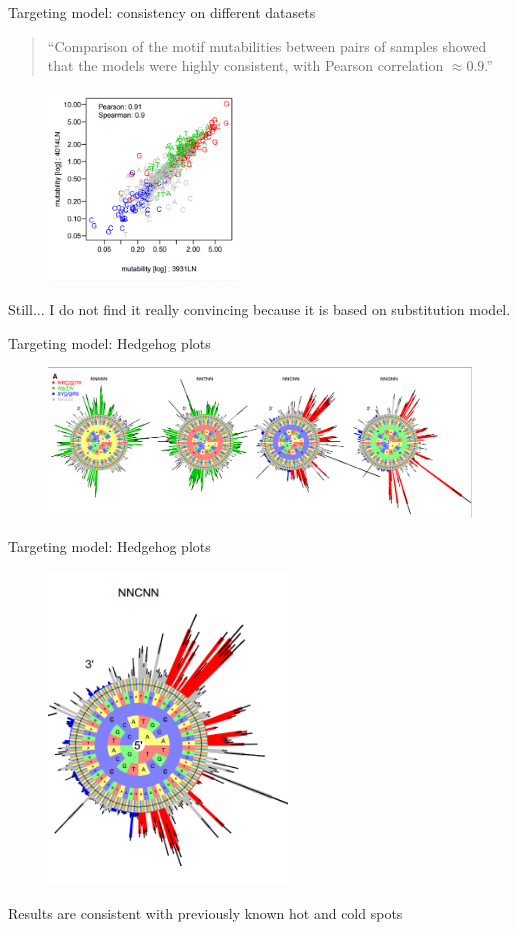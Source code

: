 \documentclass{beamer}\usepackage[]{graphicx}\usepackage[]{color}
\begin{document}
\begin{frame}{Targeting model: consistency on different datasets}
    \begin{quote}
        ``Comparison
        of the motif mutabilities between pairs of samples showed
        that the models were highly consistent, with Pearson correlation
        $\approx 0.9$.''
    \end{quote}
  \begin{figure}[h]
    \center\includegraphics[width=145pt]{Pictures/targeting_consistency.png}
 \end{figure}
 {\color{blue} Still... I do not find it really convincing because it is based on substitution model.}
\end{frame}

\begin{frame}{Targeting model: Hedgehog plots}
    \begin{figure}[h]
        \center\includegraphics[width=320pt]{Pictures/hedgehog1.png}
    \end{figure}
\end{frame}
\begin{frame}{Targeting model: Hedgehog plots}
    \begin{figure}[h]
        \center\includegraphics[width=180pt]{Pictures/hedgehog2.png}
    \end{figure}
    {\color{blue} Results are consistent with previously known hot and cold spots}
\end{frame}
\end{document}
